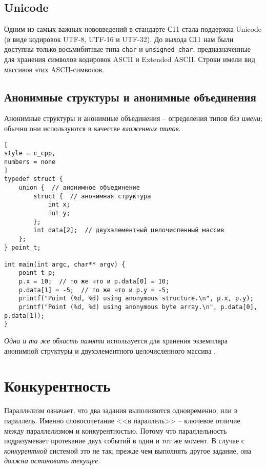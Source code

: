 \documentclass[%
	11pt,
	a4paper,
	utf8,
		]{article}
\begin{document}
\subsection{Unicode}

Одним из самых важных нововведений в стандарте С11 стала поддержка Unicode (в виде кодировок UTF-8, UTF-16 и UTF-32). До выхода С11 нам были доступны только восьмибитные типа \verb|char| и \verb|unsigned char|, предназначенные для хранения символов кодировок ASCII и Extended ASCII. Строки имели вид массивов этих ASCII-символов. 

\subsection{Анонимные структуры и анонимные объединения}

Анонимные структуры и анонимные объединения -- определения типов \emph{без имени}; обычно они используются в качестве \emph{вложенных типов}. 

\begin{lstlisting}[
style = c_cpp,
numbers = none
]
typedef struct {
    union {  // анонимное объединение
    	struct {  // анонимная структура
    	    int x;
    	    int y;
    	};
    	int data[2];  // двухэлементный целочисленный массив
    };
} point_t;

int main(int argc, char** argv) {
    point_t p;
    p.x = 10;  // то же что и p.data[0] = 10;
    p.data[1] = -5;  // то же что и p.y = -5;
    printf("Point (%d, %d) using anonymous structure.\n", p.x, p.y);
    printf("Point (%d, %d) using anonymous byte array.\n", p.data[0], p.data[1]);
}
\end{lstlisting}

\emph{Одна и та же область памяти} используется для хранения экземпляра анонимной структуры и двухэлементного целочисленного массива \cite[]{amini-extreme-c:2022}.

\section{Конкурентность}

Параллелизм означает, что два задания выполняются одновременно, или в параллель. Именно словосочетание <<в параллель>> -- ключевое отличие между параллелизмом и конкурентностью. Потому что параллельность подразумевает протекание двух событий в один и тот же момент. В случае с \emph{конкурентной} системой это не так; прежде чем выполнять другое задание, она \emph{должна остановить текущее}.
\end{document}
